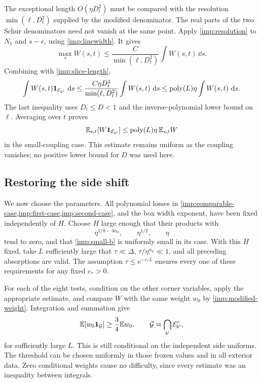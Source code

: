The exceptional length $O(\eta D_t^2)$ must be compared with the
resolution $\min(\ell,D_t^2)$ supplied by the modified denominator.
The real parts of the two Schur denominators need not vanish at the same
point. Apply \cref{imp:resolution} to $N_1$ and $s-e$, using
\cref{imp:linewidth}. It gives
\[
 \max_s W(s,t)
 \le\frac{C}{\min(\ell,D_t^2)}\int W(s,t)\,\dd s.
\]
Combining with \cref{imp:slice-length},
\[
 \int W(s,t)\mathbf 1_{\mathcal E_{b'}}\,\,\mathrm d s
 \le\frac{C\eta D_t^2}{\min(\ell,D_t^2)}
       \int W(s,t)\,\,\mathrm d s
 \le\operatorname{poly}(L)\eta\int W(s,t)\,\,\mathrm d s.
\]
The last inequality uses $D_t\le D<1$ and the inverse-polynomial lower
bound on $\ell$. Averaging over $t$ proves
\begin{equation}
 \mathbb E_{s,t}[W\mathbf 1_{\mathcal E_{b'}}]
 \le\operatorname{poly}(L)\eta\,\mathbb E_{s,t}W
 \label{imp:second-case}
\end{equation}
in the small-coupling case. This estimate remains uniform as the coupling
vanishes; no positive lower bound for $D$ was used here.

\subsection{Restoring the side shift}

We now choose the parameters. All polynomial losses in
\cref{imp:comparable-case,imp:first-case,imp:second-case}, and the box
width exponent, have been fixed independently of $H$. Choose $H$ large
enough that their products with
\[
 \eta^{1/8-3\alpha_0},\qquad \eta^{1/2},\qquad\eta
\]
tend to zero, and that \cref{imp:small-b} is uniformly small in its
case. With this $H$ fixed, take $L$ sufficiently large that
$\tau\ll\Delta$, $\tau/\eta^{\alpha_0}\ll1$, and all preceding
absorptions are valid. The assumption $\tau\le e^{-c_*L}$ ensures every
one of these requirements for any fixed $c_*>0$.

For each of the eight tests, condition on the other corner variables,
apply the appropriate estimate, and compare $W$ with the same weight
$w_0$ by \cref{imp:modified-weight}. Integration and summation give
\begin{equation}
 \mathbb E[w_0\mathbf 1_{\mathcal G}]\ge\frac34\mathbb E w_0,
 \qquad
 \mathcal G=\bigcap_{b'}\mathcal E_{b'}^c,
 \label{imp:weighted-Qgood}
\end{equation}
for sufficiently large $L$. This is still conditional on the independent
side uniforms. The threshold can be chosen uniformly in those frozen
values and in all exterior data. Zero conditional weights cause no
difficulty, since every estimate was an inequality between integrals.


